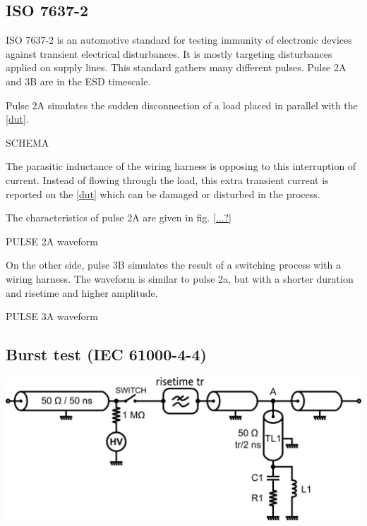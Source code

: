 \subsection{ISO 7637-2}
ISO 7637-2\cite{iso7637-2} is an automotive standard for testing immunity of electronic devices against transient electrical disturbances.
It is mostly targeting disturbances applied on supply lines.
This standard gathers many different pulses. Pulse 2A and 3B are in the ESD timescale.

Pulse 2A simulates the sudden disconnection of a load placed in parallel with the \ref{dut}.

SCHEMA

The parasitic inductance of the wiring harness is opposing to this interruption of current.
Instead of flowing through the load, this extra transient current is reported on the \ref{dut} which can be damaged or disturbed in the process.

The characteristics of pulse 2A are given in fig. \ref{...?}

PULSE 2A waveform

On the other side, pulse 3B simulates the result of a switching process with a wiring harness.
The waveform is similar to pulse 2a, but with a shorter duration and risetime and higher amplitude.

PULSE 3A waveform

\subsection{Burst test (IEC 61000-4-4)}

\includegraphics[width=\textwidth,height=\textheight,keepaspectratio]{src/2/figures/tlp_iec.png}

